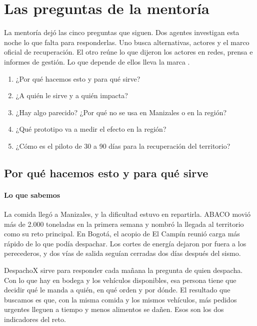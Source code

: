 \section{Las preguntas de la mentoría}

La mentoría dejó las cinco preguntas que siguen. Dos agentes investigan esta noche lo que falta para responderlas. Uno busca alternativas, actores y el marco oficial de recuperación. El otro reúne lo que dijeron los actores en redes, prensa e informes de gestión. Lo que depende de ellos lleva la marca \eninvestigacion.

\begin{enumerate}[leftmargin=1.6em, itemsep=0.1em]
\item ¿Por qué hacemos esto y para qué sirve?
\item ¿A quién le sirve y a quién impacta?
\item ¿Hay algo parecido? ¿Por qué no se usa en Manizales o en la región?
\item ¿Qué prototipo va a medir el efecto en la región?
\item ¿Cómo es el piloto de 30 a 90 días para la recuperación del territorio?
\end{enumerate}

\subsection{Por qué hacemos esto y para qué sirve}

\paragraph{Lo que sabemos} La comida llegó a Manizales, y la dificultad estuvo en repartirla. ABACO movió más de 2.000 toneladas en la primera semana y nombró la llegada al territorio como su reto principal. En Bogotá, el acopio de El Campín reunió carga más rápido de lo que podía despachar. Los cortes de energía dejaron por fuera a los perecederos, y dos vías de salida seguían cerradas dos días después del sismo.

DespachoX sirve para responder cada mañana la pregunta de quien despacha. Con lo que hay en bodega y los vehículos disponibles, esa persona tiene que decidir qué le manda a quién, en qué orden y por dónde. El resultado que buscamos es que, con la misma comida y los mismos vehículos, más pedidos urgentes lleguen a tiempo y menos alimentos se dañen. Esos son los dos indicadores del reto.


